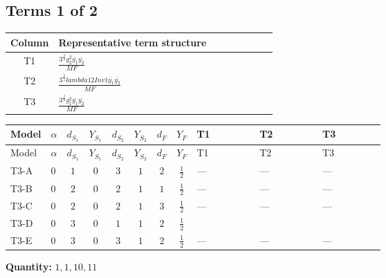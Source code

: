 \documentclass[8pt]{article}
\begin{document}
\begin{landscape}
\subsection*{Terms 1 of 2}
\begin{center}
\begin{tabular}{@{}c >{\raggedright\arraybackslash}p{0.82\linewidth}@{}}
\toprule
Column & Representative term structure \\
\midrule
T1 & \(\displaystyle \frac{3^{\frac{3}{4}} g_{2}^{2} \overline{y_{1}} \overline{y_{2}}}{MF}\) \\
\midrule
T2 & \(\displaystyle \frac{3^{\frac{3}{4}} lambda12Inv1 \overline{y_{1}} \overline{y_{2}}}{MF}\) \\
\midrule
T3 & \(\displaystyle \frac{3^{\frac{3}{4}} g_{1}^{2} \overline{y_{1}} \overline{y_{2}}}{MF}\) \\
\midrule
\bottomrule
\end{tabular}
\end{center}
\smallskip
\tiny
\begin{longtable}{@{}llcccccc >{\raggedright\arraybackslash}p{0.21\linewidth} >{\raggedright\arraybackslash}p{0.21\linewidth} >{\raggedright\arraybackslash}p{0.21\linewidth}@{}}
\toprule
Model & $\alpha$ & $d_{S_1}$ & $Y_{S_1}$ & $d_{S_2}$ & $Y_{S_2}$ & $d_F$ & $Y_F$ & T1 & T2 & T3 \\
\midrule
\endfirsthead
\toprule
Model & $\alpha$ & $d_{S_1}$ & $Y_{S_1}$ & $d_{S_2}$ & $Y_{S_2}$ & $d_F$ & $Y_F$ & T1 & T2 & T3 \\
\midrule
\endhead
T3-A & $0$ & $1$ & $0$ & $3$ & $1$ & $2$ & $\frac{1}{2}$ & --- & --- & --- \\
\midrule
T3-B & $0$ & $2$ & $0$ & $2$ & $1$ & $1$ & $\frac{1}{2}$ & --- & --- & --- \\
\midrule
T3-C & $0$ & $2$ & $0$ & $2$ & $1$ & $3$ & $\frac{1}{2}$ & --- & --- & --- \\
\midrule
T3-D & $0$ & $3$ & $0$ & $1$ & $1$ & $2$ & $\frac{1}{2}$ & \scriptsize\adjustbox{max width=\linewidth}{$\begin{gathered} - \frac{11 \cdot 3^{\frac{3}{4}} g_{2}^{2} \overline{y_{1}} \overline{y_{2}}}{8 MF}\end{gathered}$} & \scriptsize\adjustbox{max width=\linewidth}{$\begin{gathered} - \frac{3^{\frac{3}{4}} lambda12Inv1 \overline{y_{1}} \overline{y_{2}}}{6 MF}\end{gathered}$} & \scriptsize\adjustbox{max width=\linewidth}{$\begin{gathered} - \frac{3^{\frac{3}{4}} g_{1}^{2} \overline{y_{1}} \overline{y_{2}}}{8 MF}\end{gathered}$} \\
\midrule
T3-E & $0$ & $3$ & $0$ & $3$ & $1$ & $2$ & $\frac{1}{2}$ & --- & --- & --- \\
\midrule
\bottomrule
\end{longtable}
\clearpage
\noindent\textbf{Quantity: }$\mathrm{1,1,10,11}$\par\smallskip

\end{landscape}
\end{document}
